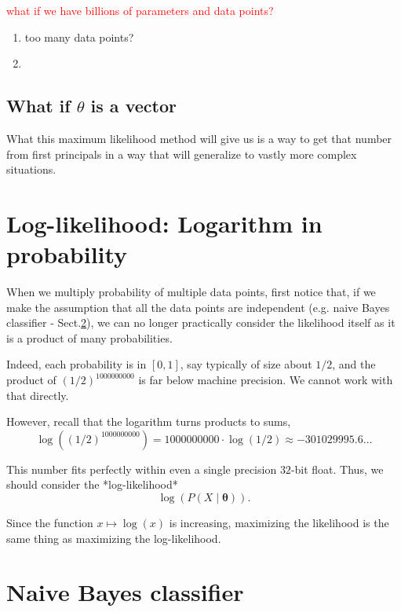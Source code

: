 \textcolor{red}{what if we have billions of parameters and data points?}
\begin{enumerate}
  \item  too many data points?
  
  
  \item 
\end{enumerate}

\subsection{What if $\theta$ is a vector}
 
What this maximum likelihood method will give us is a way to get that number
from first principals in a way that will generalize to vastly more complex
situations.

\section{Log-likelihood: Logarithm in probability}
\label{sec:maximum-log-likelihood}

When we multiply probability of multiple data points, first notice that, if we
make the assumption that all the data points are independent (e.g. naive Bayes
classifier - Sect.\ref{sec:naive-Bayes-classifier}), we can no longer
practically consider the likelihood itself as it is a product of many
probabilities.

  Indeed, each probability is in $[0,1]$, say typically of size about $1/2$, and
  the product of $(1/2)^{1000000000}$ is far below machine precision.  We cannot
  work with that directly.
    

However, recall that the logarithm turns products to sums,
\begin{equation}
\log((1/2)^{1000000000}) = 1000000000\cdot\log(1/2) \approx -301029995.6\ldots
\end{equation}

This number fits perfectly within even a single precision $32$-bit float.  Thus, we should consider the *log-likelihood*
\begin{equation}
\log(P(X \mid \boldsymbol{\theta})).
\end{equation}

Since the function $x \mapsto \log(x)$ is increasing, maximizing the likelihood
is the same thing as maximizing the log-likelihood.

\section{Naive Bayes classifier}
\label{sec:naive-Bayes-classifier}

